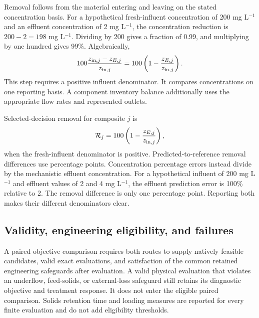 Removal follows from the material entering and leaving on the stated concentration basis. For a hypothetical fresh-influent concentration of 200 mg L$^{-1}$ and an effluent concentration of 2 mg L$^{-1}$, the concentration reduction is $200-2=198$ mg L$^{-1}$. Dividing by 200 gives a fraction of 0.99, and multiplying by one hundred gives 99\%. Algebraically,
\[
100\frac{z_{{\rm in},j}-z_{E,j}}{z_{{\rm in},j}}
=100\left(1-\frac{z_{E,j}}{z_{{\rm in},j}}\right).
\]
This step requires a positive influent denominator. It compares concentrations on one reporting basis. A component inventory balance additionally uses the appropriate flow rates and represented outlets.

Selected-decision removal for composite $j$ is
\begin{equation}
\equationname{Percentage removal of a reported water-quality quantity}
\mathcal R_j=100\left(1-\frac{z_{E,j}}{z_{{\rm in},j}}\right),
\end{equation}
when the fresh-influent denominator is positive. Predicted-to-reference removal differences use percentage points. Concentration percentage errors instead divide by the mechanistic effluent concentration. For a hypothetical influent of 200 mg L$^{-1}$ and effluent values of 2 and 4 mg L$^{-1}$, the effluent prediction error is 100\% relative to 2. The removal difference is only one percentage point. Reporting both makes their different denominators clear.

\subsection{Validity, engineering eligibility, and failures}

A paired objective comparison requires both routes to supply natively feasible candidates, valid exact evaluations, and satisfaction of the common retained engineering safeguards after evaluation. A valid physical evaluation that violates an underflow, feed-solids, or external-loss safeguard still retains its diagnostic objective and treatment response. It does not enter the eligible paired comparison. Solids retention time and loading measures are reported for every finite evaluation and do not add eligibility thresholds.

